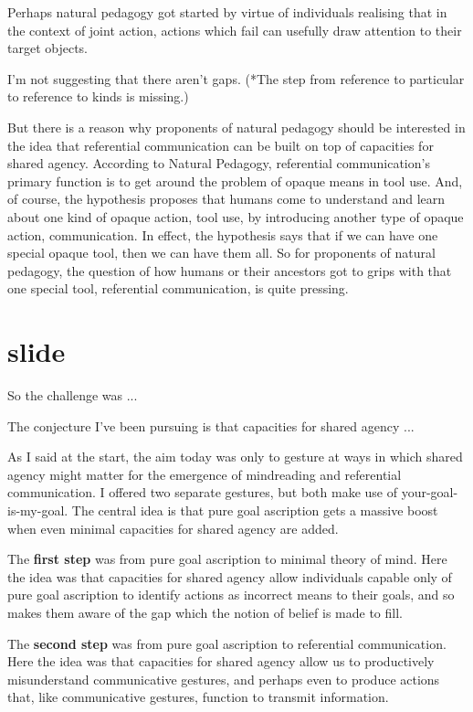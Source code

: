 \documentclass[12pt,\papersize]{extarticle}
\begin{document}
Perhaps natural pedagogy got started by virtue of individuals realising that in the context of joint action, actions which fail can usefully draw attention to their target objects.

I'm not suggesting that there aren't gaps.
(*The step from reference to particular to reference to kinds is missing.)

But there is a reason why proponents of natural pedagogy should be interested in the idea that referential communication can be built on top of capacities for shared agency.
According to Natural Pedagogy, referential communication's primary function is to get around the problem of opaque means in tool use.
And, of course, the hypothesis proposes that humans come to understand and learn about one kind of opaque action, tool use, by introducing another type of opaque action, communication.
In effect, the hypothesis says that if we can have one special opaque tool, then we can have them all. 
So for proponents of natural pedagogy, the question of how humans or their ancestors got to grips with that one special tool, referential communication, is quite pressing.


\section{slide}
So the challenge was ...

The conjecture I've been pursuing is that capacities for shared agency ...

As I said at the start, the aim today was only to gesture at ways in which shared agency might matter for the emergence of mindreading and referential communication.
I offered two separate gestures,
but both make use of your-goal-is-my-goal.
The central idea is that pure goal ascription gets a massive boost when even minimal capacities for shared agency are added.

The \textbf{first step} was from pure goal ascription to minimal theory of mind.
Here the idea was that capacities for shared agency allow individuals capable only of pure goal ascription to identify actions as incorrect means to their goals, and so makes them aware of the gap which the notion of belief is made to fill.

The \textbf{second step} was from pure goal ascription to referential communication.
Here the idea was that capacities for shared agency allow us to productively misunderstand communicative gestures, and perhaps even to produce actions that, like communicative gestures, function to transmit information.
\end{document}
